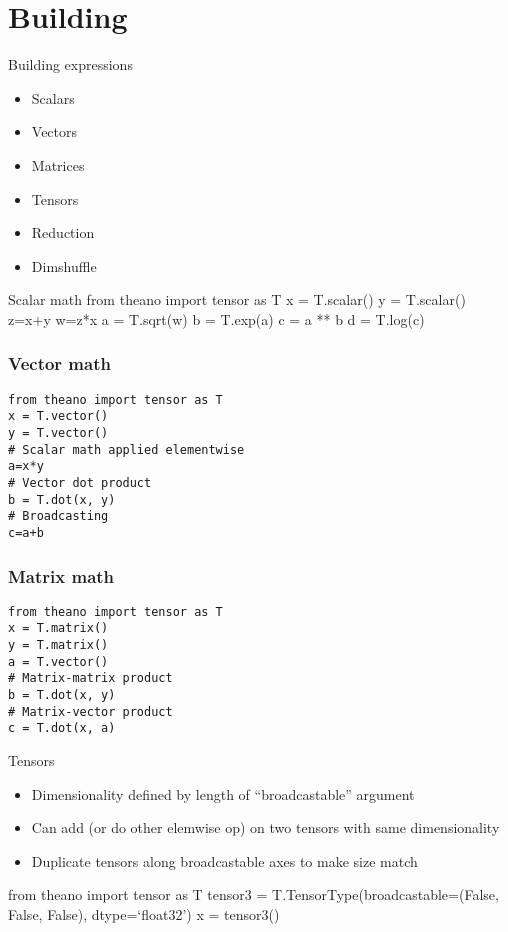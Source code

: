 \documentclass[utf8x,xcolor=pdftex,dvipsnames,table]{beamer}
\begin{document}
\section{Building}
\begin{frame}{Building expressions}
  \begin{itemize}
  \item Scalars
  \item Vectors
  \item Matrices
  \item Tensors
  \item Reduction
  \item Dimshuffle
  \end{itemize}
\end{frame}

\begin{frame}{Scalar math}
from theano import tensor as T
x = T.scalar()
y = T.scalar()
z=x+y
w=z*x
a = T.sqrt(w)
b = T.exp(a)
c = a ** b
d = T.log(c)
\end{frame}

\begin{frame}[fragile]
  \frametitle{Vector math}

\begin{lstlisting}
from theano import tensor as T
x = T.vector()
y = T.vector()
# Scalar math applied elementwise
a=x*y
# Vector dot product
b = T.dot(x, y)
# Broadcasting
c=a+b
\end{lstlisting}
\end{frame}

\begin{frame}[fragile]
  \frametitle{Matrix math}

\begin{lstlisting}
from theano import tensor as T
x = T.matrix()
y = T.matrix()
a = T.vector()
# Matrix-matrix product
b = T.dot(x, y)
# Matrix-vector product
c = T.dot(x, a)
\end{lstlisting}
\end{frame}

\begin{frame}{Tensors}
  \begin{itemize}
  \item Dimensionality defined by length of “broadcastable” argument

  \item Can add (or do other elemwise op) on two
    tensors with same dimensionality
  \item Duplicate tensors along broadcastable axes to
    make size match
  \end{itemize}
from theano import tensor as T
tensor3 =
T.TensorType(broadcastable=(False, False,
False), dtype=‘float32’)
x = tensor3()
\end{frame}
\end{document}
